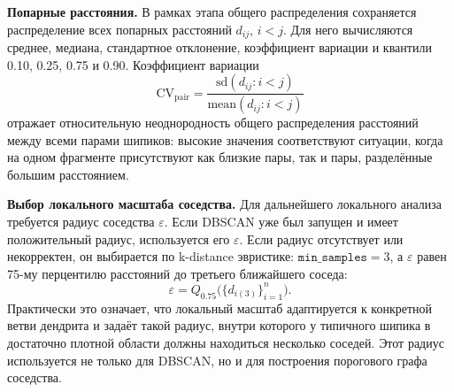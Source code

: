 \documentclass[12pt,a4paper]{article}
\begin{document}
\noindent\textbf{Попарные расстояния.}
В рамках этапа общего распределения сохраняется распределение всех попарных расстояний \(d_{ij}\), \(i<j\). Для него вычисляются среднее, медиана, стандартное отклонение, коэффициент вариации и квантили 0.10, 0.25, 0.75 и 0.90. Коэффициент вариации
\[
\mathrm{CV}_{\mathrm{pair}}=\frac{\mathrm{sd}(d_{ij}:i<j)}{\mathrm{mean}(d_{ij}:i<j)}
\]
отражает относительную неоднородность общего распределения расстояний между всеми парами шипиков: высокие значения соответствуют ситуации, когда на одном фрагменте присутствуют как близкие пары, так и пары, разделённые большим расстоянием.

\noindent\textbf{Выбор локального масштаба соседства.}
Для дальнейшего локального анализа требуется радиус соседства \(\varepsilon\). Если DBSCAN уже был запущен и имеет положительный радиус, используется его \(\varepsilon\). Если радиус отсутствует или некорректен, он выбирается по k-distance эвристике: \(\texttt{min\_samples}=3\), а \(\varepsilon\) равен 75-му перцентилю расстояний до третьего ближайшего соседа:
\[
\varepsilon=Q_{0.75}\bigl(\{d_{i(3)}\}_{i=1}^{n}\bigr).
\]
Практически это означает, что локальный масштаб адаптируется к конкретной ветви дендрита и задаёт такой радиус, внутри которого у типичного шипика в достаточно плотной области должны находиться несколько соседей. Этот радиус используется не только для DBSCAN, но и для построения порогового графа соседства.
\end{document}
